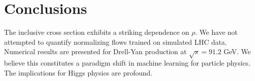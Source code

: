 \section{Conclusions}\label{sec:conclusions}

The inclusive cross section exhibits a striking dependence on $\rho$. We
have not attempted to quantify normalizing flows trained on simulated
LHC data. Numerical results are presented for Drell-Yan production at
$\sqrt{s} = 91.2$ GeV. We believe this constitutes a paradigm shift in
machine learning for particle physics. The implications for Higgs
physics are profound.

